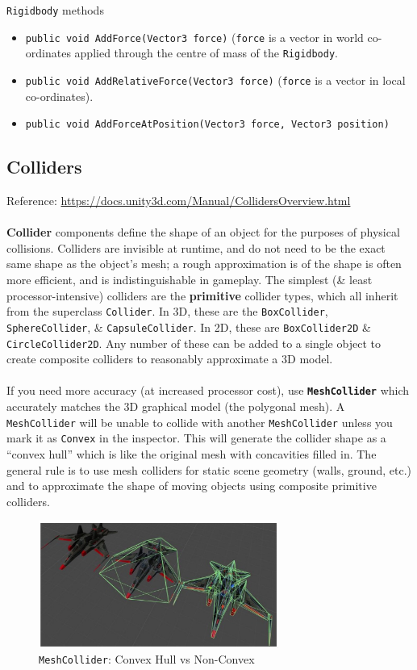 \documentclass[a4paper,11pt]{article}
\begin{document}
\verb|Rigidbody| methods
\begin{itemize}
    \item   \texttt{public void AddForce(Vector3 force)} (\verb|force| is a vector in world co-ordinates
            applied through the centre of mass of the \verb|Rigidbody|.
    \item   \texttt{public void AddRelativeForce(Vector3 force)} (\verb|force| is a vector in local
            co-ordinates).
    \item   \texttt{public void AddForceAtPosition(Vector3 force, Vector3 position)}

\end{itemize}

\subsection{Colliders}
Reference: \url{https://docs.unity3d.com/Manual/CollidersOverview.html}
\\\\
\textbf{Collider} components define the shape of an object for the purposes of physical collisions. 
Colliders are invisible at runtime, and do not need to be the exact same shape as the object's mesh; a rough 
approximation is of the shape is often more efficient, and is indistinguishable in gameplay.
The simplest (\& least processor-intensive) colliders are the \textbf{primitive} collider types, which all
inherit from the superclass \verb|Collider|. 
In 3D, these are the \verb|BoxCollider|, \verb|SphereCollider|, \& \verb|CapsuleCollider|.
In 2D, these are \verb|BoxCollider2D| \& \verb|CircleCollider2D|. 
Any number of these can be added to a single object to create composite colliders to reasonably approximate a 3D
model.
\\\\
If you need more accuracy (at increased processor cost), use \textbf{\texttt{MeshCollider}} which accurately 
matches the 3D graphical model (the polygonal mesh). 
A \verb|MeshCollider| will be unable to collide with another \verb|MeshCollider| unless you mark it as
\verb|Convex| in the inspector.
This will generate the collider shape as a ``convex hull'' which is like the original mesh with concavities 
filled in.
The general rule is to use mesh colliders for static scene geometry (walls, ground, etc.) and to approximate the 
shape of moving objects using composite primitive colliders.
\begin{figure}[H]
    \centering
    \includegraphics[width=0.7\textwidth]{./images/MeshCollider.png}
    \caption{\texttt{MeshCollider}: Convex Hull vs Non-Convex}
\end{figure}
\end{document}
